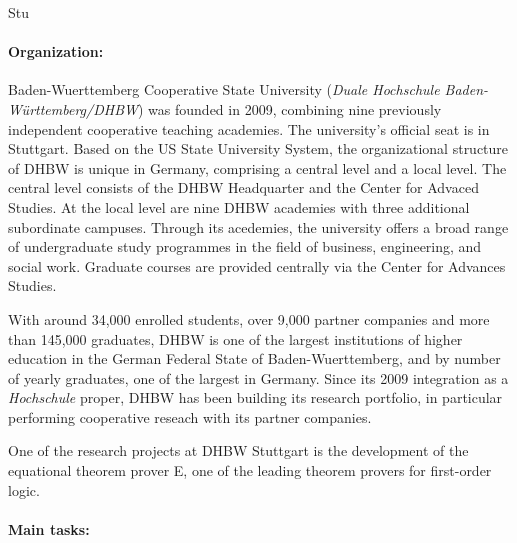 \begin{sitedescription}{Stu}

\paragraph{Organization:}



Baden-Wuerttemberg Cooperative State University (\emph{Duale
  Hochschule Baden-Württemberg/DHBW}) was founded in 2009, combining
nine previously independent cooperative teaching academies. The
university's official seat is in Stuttgart. Based on the US State
University System, the organizational structure of DHBW is unique in
Germany, comprising a central level and a local level. The central
level consists of the DHBW Headquarter and the Center for Advaced
Studies. At the local level are nine DHBW academies with three
additional subordinate campuses. Through its acedemies, the university
offers a broad range of undergraduate study programmes in the field of
business, engineering, and social work. Graduate courses are provided
centrally via the Center for Advances Studies.


With around 34,000 enrolled students, over 9,000 partner companies and
more than 145,000 graduates, DHBW is one of the largest institutions
of higher education in the German Federal State of Baden-Wuerttemberg,
and by number of yearly graduates, one of the largest in Germany.
Since its 2009 integration as a \emph{Hochschule} proper, DHBW has
been building its research portfolio, in particular performing
cooperative reseach with its partner companies.

One of the research projects at DHBW Stuttgart is the development of
the equational theorem prover E, one of the leading theorem provers
for first-order logic.


\paragraph{Main tasks:}


\end{sitedescription}

